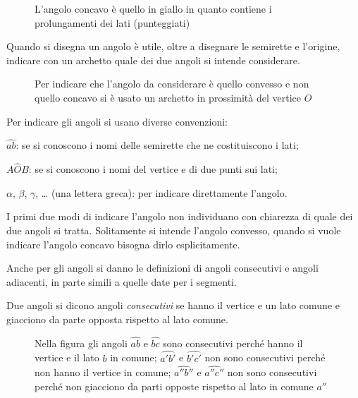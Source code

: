 \begin{figure*}[htb]
\centering  
\caption{L'angolo concavo è quello in giallo in quanto contiene i prolungamenti dei lati (punteggiati)}\label{fig:1.20}
\end{figure*}

Quando si disegna un angolo è utile, oltre a disegnare le semirette e l'origine, indicare con un archetto quale dei due angoli si intende considerare.

\begin{figure}[htb]
 \centering 
\caption{Per indicare che l'angolo da considerare è quello convesso e non quello concavo si è usato un archetto in prossimità del vertice $O$}\label{fig:1.21}
\end{figure}

Per indicare gli angoli si usano diverse convenzioni:
\begin{itemize*}
\item  $\widehat{ab}$: se si conoscono i nomi delle semirette che ne costituiscono i lati;
\item  $A\widehat{O}B$: se si conoscono i nomi del vertice e di due punti sui lati;
\item  $\alpha$, $\beta$, $\gamma$, \ldots{} (una lettera greca): per indicare direttamente l'angolo.
\end{itemize*}
I primi due modi di indicare l'angolo non individuano con chiarezza di quale dei due angoli si tratta. Solitamente si intende l'angolo convesso, quando si vuole indicare l'angolo concavo bisogna dirlo esplicitamente.

Anche per gli angoli si danno le definizioni di angoli consecutivi e angoli adiacenti, in parte simili a quelle date per i segmenti.

\begin{definizione}
Due angoli si dicono angoli \emph{consecutivi} se hanno il vertice e un lato comune e giacciono da parte opposta rispetto al lato comune.
\end{definizione}

\begin{figure}[htb]
 \centering 
\caption{Nella figura gli angoli  $\widehat{ab}$ e $\widehat{bc}$  sono consecutivi perché hanno il vertice e il lato $ b $ in comune;  $\widehat {a'b'}$ e $\widehat {b'c'}$  non sono consecutivi perché non hanno il vertice in comune;  $\widehat {a''b''}$ e $\widehat {a''c''}$ non sono consecutivi perché non giacciono da parti opposte rispetto al lato in comune $a''$}\label{fig:1.22}
\end{figure}

